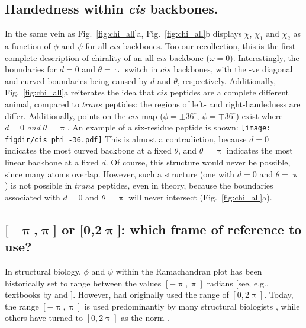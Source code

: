 \documentclass[fleqn,10pt]{wlpeerj} %
\newcommand{\Fig}[1]{Fig.~\ref{#1}}
\newcommand{\figdir}{./figures}
\begin{document}
\subsection*{Handedness within \textit{cis} backbones.}
In the same vein as \Fig{fig:chi_all}a, \Fig{fig:chi_all}b displays $\chi$, $\chi_1$ and $\chi_2$ as a function of $\phi$ and $\psi$ for all-$cis$ backbones. Too our recollection, this is the first complete description of chirality of an all-$cis$ backbone ($\omega=0$). Interestingly, the boundaries for $d=0$ and $\theta=\uppi$ switch in $cis$ backbones, with the -ve diagonal and curved boundaries being caused by $d$ and $\theta$, respectively. Additionally, \Fig{fig:chi_all}a reiterates the idea that $cis$ peptides are a complete different animal, compared to $trans$ peptides: the regions of left- and right-handedness are differ. Additionally, points on the $cis$ map ($\phi=\pm36^\circ$, $\psi=\mp36^\circ$) exist where $d=0$ {\em and} $\theta=\uppi$. An example of a six-residue peptide is shown:\newline
\mbox{}\hfill\texttt{[image: \\figdir/cis\_phi\_-36.pdf]}\hfill\mbox{}\newline
This is almost a contradiction, because $d=0$ indicates the most curved backbone at a fixed $\theta$, and $\theta=\uppi$ indicates the most linear backbone at a fixed $d$. Of course, this structure would never be possible, since many atoms overlap. However, such a structure (one with $d=0$ and $\theta=\uppi$) is not possible in $trans$ peptides, even in theory, because the boundaries associated with $d=0$ and $\theta=\uppi$ will never intersect (\Fig{fig:chi_all}a). 

\subsection*{[$\bm{-\uppi}$,$\bm{\uppi}$] or [$\bm{0}$,$\bm{2\uppi}$]: which frame of reference to use?} 
In structural biology, $\phi$ and $\psi$ within the Ramachandran plot has been historically set to range between the values $[-\uppi,\uppi]$ radians [see, e.g., textbooks by \cite{Berg2006} and \cite{Alberts2002}]. However, \cite{Ramachandran1963} had originally used the range of $[0,2\uppi]$. Today, the range $[-\uppi,\uppi]$ is used predominantly by many structural biologists \citep{Laskowski1993,Laskowski2003,Zacharias2013}, while others have turned to $[0,2\uppi]$ as the norm \citep{Nemethy1966,Voelz2011}. 
\end{document}
